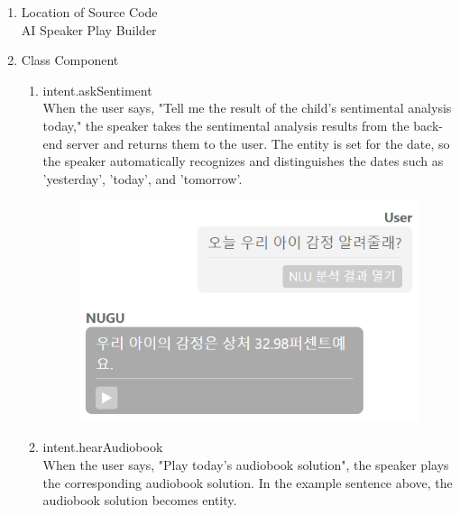 \documentclass[conference]{IEEEtran}
\begin{document}
\begin{enumerate}
\begin{enumerate}
            \item Location of Source Code
            \\AI Speaker Play Builder\newline
            
            \item Class Component
            \begin{enumerate}
                \item intent.askSentiment
                \\When the user says, "Tell me the result of the child's sentimental analysis today," the speaker takes the sentimental analysis results from the back-end server and returns them to the user. The entity is set for the date, so the speaker automatically recognizes and distinguishes the dates such as 'yesterday', 'today', and 'tomorrow'.
                \begin{figure}[H]
            \centering
            \includegraphics[scale=0.5]{new_assets/nugu-play-sentiment.png}
            \end{figure}
                
                \item intent.hearAudiobook
                \\When the user says, "Play today's audiobook solution", the speaker plays the corresponding audiobook solution. In the example sentence above, the audiobook solution becomes entity.\newline
                

\end{enumerate}
\end{enumerate}
\end{enumerate}
\end{document}
